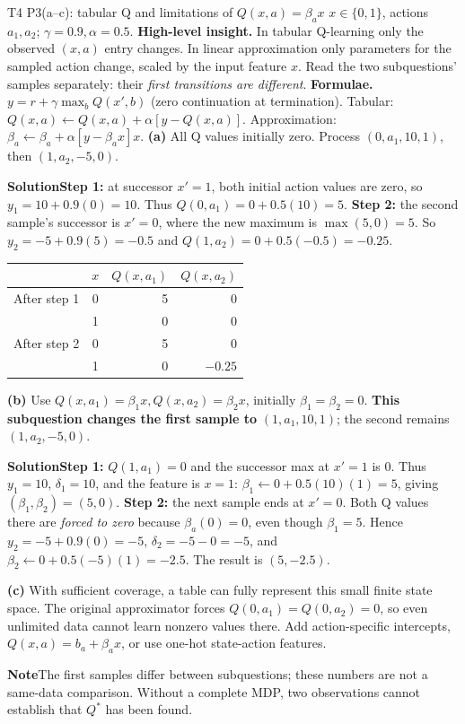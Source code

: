 \documentclass[10pt,a4paper]{article}
\newcommand{\ans}{\par\smallskip\textbf{\color{good}Solution\quad}}
\newcommand{\pit}{\par\smallskip\textbf{\color{warn}Note\quad}}
\begin{document}
\begin{question}{T4 P3(a--c): tabular Q and limitations of $Q(x,a)=\beta_ax$}\label{q:t4p3}
$x\in\{0,1\}$, actions $a_1,a_2$; $\gamma=0.9,\alpha=0.5$.
\textbf{High-level insight.} In tabular Q-learning only the observed $(x,a)$ entry changes. In linear approximation only parameters for the sampled action change, scaled by the input feature $x$. Read the two subquestions' samples separately: their \emph{first transitions are different}.
\textbf{Formulae.} $y=r+\gamma\max_b Q(x',b)$ (zero continuation at termination). Tabular: $Q(x,a)\leftarrow Q(x,a)+\alpha[y-Q(x,a)]$. Approximation: $\beta_a\leftarrow\beta_a+\alpha[y-\beta_ax]x$.
\textbf{(a)} All Q values initially zero. Process $(0,a_1,10,1)$, then $(1,a_2,-5,0)$.
\ans \textbf{Step 1:} at successor $x'=1$, both initial action values are zero, so $y_1=10+0.9(0)=10$. Thus $Q(0,a_1)=0+0.5(10)=5$.
\textbf{Step 2:} the second sample's successor is $x'=0$, where the new maximum is $\max(5,0)=5$. So $y_2=-5+0.9(5)=-0.5$ and $Q(1,a_2)=0+0.5(-0.5)=-0.25$.
\begin{center}
\begin{tabular}{@{}ccrr@{}}
\toprule & $x$ & $Q(x,a_1)$ & $Q(x,a_2)$ \\\midrule
After step 1 & 0 & 5 & 0 \\
 & 1 & 0 & 0 \\\midrule
After step 2 & 0 & 5 & 0 \\
 & 1 & 0 & $-0.25$ \\\bottomrule
\end{tabular}
\end{center}
\textbf{(b)} Use $Q(x,a_1)=\beta_1x,Q(x,a_2)=\beta_2x$, initially $\beta_1=\beta_2=0$. \textbf{This subquestion changes the first sample to} $(1,a_1,10,1)$; the second remains $(1,a_2,-5,0)$.
\ans \textbf{Step 1:} $Q(1,a_1)=0$ and the successor max at $x'=1$ is 0. Thus $y_1=10$, $\delta_1=10$, and the feature is $x=1$: $\beta_1\leftarrow0+0.5(10)(1)=5$, giving $(\beta_1,\beta_2)=(5,0)$.
\textbf{Step 2:} the next sample ends at $x'=0$. Both Q values there are \emph{forced to zero} because $\beta_a(0)=0$, even though $\beta_1=5$. Hence $y_2=-5+0.9(0)=-5$, $\delta_2=-5-0=-5$, and $\beta_2\leftarrow0+0.5(-5)(1)=-2.5$. The result is $(5,-2.5)$.

\textbf{(c)} With sufficient coverage, a table can fully represent this small finite state space. The original approximator forces $Q(0,a_1)=Q(0,a_2)=0$, so even unlimited data cannot learn nonzero values there. Add action-specific intercepts, $Q(x,a)=b_a+\beta_ax$, or use one-hot state-action features.
\pit The first samples differ between subquestions; these numbers are not a same-data comparison. Without a complete MDP, two observations cannot establish that $Q^*$ has been found.
\end{question}
\end{document}
